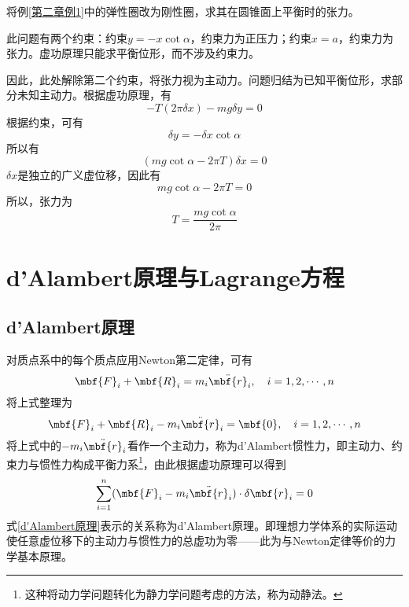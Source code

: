 \begin{example}
将例\ref{第二章例1}中的弹性圈改为刚性圈，求其在圆锥面上平衡时的张力。
\end{example}
\begin{solution}
此问题有两个约束：约束$y=-x\cot\alpha$，约束力为正压力；约束$x=a$，约束力为张力。虚功原理只能求平衡位形，而不涉及约束力。

因此，此处解除第二个约束，将张力视为主动力。问题归结为已知平衡位形，求部分未知主动力。根据虚功原理，有
\begin{equation*}
	-T(2\pi \delta x) - mg\delta y = 0
\end{equation*}
根据约束，可有
\begin{equation*}
	\delta y = -\delta x \cot \alpha
\end{equation*}
所以有
\begin{equation*}
	(mg\cot \alpha - 2\pi T) \delta x = 0
\end{equation*}
$\delta x$是独立的广义虚位移，因此有
\begin{equation*}
	mg\cot \alpha - 2\pi T = 0
\end{equation*}
所以，张力为
\begin{equation*}
	T = \frac{mg\cot \alpha}{2\pi}
\end{equation*}
\end{solution}

\section{d'Alambert原理与Lagrange方程}

\subsection{d'Alambert原理}

对质点系中的每个质点应用Newton第二定律，可有
\begin{equation*}
	\mbf{F}_i + \mbf{R}_i = m_i \ddot{\mbf{r}}_i,\quad i=1,2,\cdots,n
\end{equation*}
将上式整理为
\begin{equation*}
	\mbf{F}_i + \mbf{R}_i - m_i \ddot{\mbf{r}}_i = \mbf{0},\quad i=1,2,\cdots,n
\end{equation*}
将上式中的$-m_i \ddot{\mbf{r}}_i$看作一个主动力，称为{\heiti d'Alambert惯性力}，即主动力、约束力与惯性力构成平衡力系\footnote{这种将动力学问题转化为静力学问题考虑的方法，称为{\heiti 动静法}。}，由此根据虚功原理可以得到
\begin{equation}
	\sum_{i=1}^n(\mbf{F}_i - m_i \ddot{\mbf{r}}_i) \cdot \delta \mbf{r}_i = 0
	\label{d'Alambert原理}
\end{equation}
式\eqref{d'Alambert原理}表示的关系称为{\heiti d'Alambert原理}。即理想力学体系的实际运动使任意虚位移下的主动力与惯性力的总虚功为零——此为与Newton定律等价的力学基本原理。

